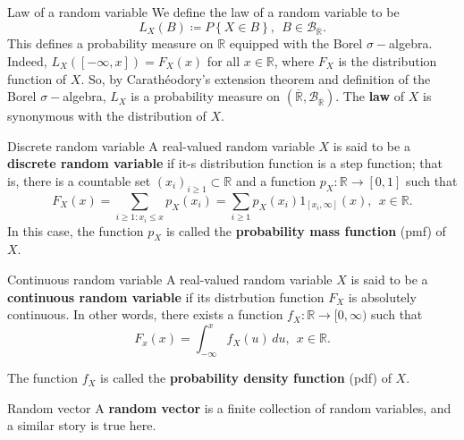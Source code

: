 \begin{defn}{Law of a random variable}{}
    We define the law of a random variable to be 
    \[
        L_{X} (B)\coloneqq P\left\{ X \in B \right\}, \ \ B \in \mathcal{B} _{\overline{\mathbb{R} } }.
    \]
    This defines a probability measure on \( \mathbb{R}  \) equipped with the Borel \( \sigma - \)algebra. Indeed, \( L_{X} ([- \infty ,x]) = F_{X} (x) \) for all \( x \in \mathbb{R}  \), where \( F_{X}  \) is the distribution function of \( X \). So, by Carathéodory’s extension theorem and definition of the Borel \( \sigma - \)algebra, \( L_{X}  \) is a probability measure on \( (\overline{\mathbb{R} } , \mathcal{B} _{\overline{\mathbb{R} } }) \). The \textbf{law} of \( X \) is synonymous with the distribution of \( X \). 
\end{defn}

\begin{defn}{Discrete random variable}{}
A real-valued random variable \( X \) is said to be a \textbf{discrete random variable} if it-s distribution function is a step function; that is, there is a countable set \( (x _{i} )_{i\geq 1} \subset \mathbb{R}  \) and a function \( p_{X}:\mathbb{R} \to [0,1]  \) such that 
\[
    F_{X} (x) = \sum_{i\geq 1:x_{i} \leq x}p_{X} (x _{i} ) = \sum_{i \geq 1} p_{X} (x _{i} )1_{[x_{i} , \infty ]}(x), \ \ x\in \mathbb{R} . 
\]
In this case, the function \( p_{X}  \) is called the \textbf{probability mass function} (pmf) of \( X \). 

\end{defn}

\begin{defn}{Continuous random variable}{}
A real-valued random variable \( X \) is said to be a \textbf{continuous random variable} if its distrbution function \( F_{X}  \) is absolutely continuous. In other words, there exists a function \( f_{X} :\mathbb{R} \to [0, \infty) \) such that 
\[
    F_{x} (x) = \int_{-\infty}^{x} f_{X} (u) \,du, \ \ x \in  \mathbb{R} .  
\]

The function \( f_{X}  \) is called the \textbf{probability density function} (pdf) of \( X \). 
\end{defn}

\begin{defn}{Random vector}{}
A \textbf{random vector} is a finite collection of random variables, and a similar story is true here. 
\end{defn}